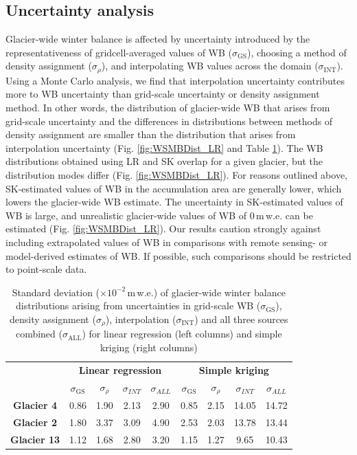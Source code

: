 \documentclass[review,oneside, letterpaper]{igs}
\begin{document}
\subsection{Uncertainty analysis}

Glacier-wide winter balance is affected by uncertainty introduced by the representativeness of gridcell-averaged values of WB ($\sigma_{\mathrm{GS}}$), choosing a method of density assignment ($\sigma_{\rho}$), and interpolating WB values across the domain ($\sigma_{\mathrm{INT}}$). Using a Monte Carlo analysis, we find that interpolation uncertainty contributes more to WB uncertainty than grid-scale uncertainty or density assignment method. In other words, the distribution of glacier-wide WB that arises from grid-scale uncertainty and the differences in distributions between methods of density assignment are smaller than the distribution that arises from interpolation uncertainty (Fig. \ref{fig:WSMBDist_LR} and Table \ref{tab:WSMBdistribution_sigma}). The WB distributions obtained using LR and SK overlap for a given glacier, but the distribution modes differ (Fig. \ref{fig:WSMBDist_LR}). For reasons outlined above, SK-estimated values of WB in the accumulation area are generally lower, which lowers the glacier-wide WB estimate.  The uncertainty in SK-estimated values of WB is large, and unrealistic glacier-wide values of WB of 0\,m\,w.e. can be estimated (Fig. \ref{fig:WSMBDist_LR}). Our results caution strongly against including extrapolated values of WB in comparisons with remote sensing- or model-derived estimates of WB. If possible, such comparisons should be restricted to point-scale data. 

 \begin{table}[]
\centering
\caption{Standard deviation ($\times10^{-2}$\,m\,w.e.) of glacier-wide winter balance distributions arising from uncertainties in grid-scale WB ($\sigma_{\mathrm{GS}}$), density assignment ($\sigma_{\rho}$), interpolation ($\sigma_{\mathrm{INT}}$) and all three sources combined ($\sigma_{\mathrm{ALL}}$) for linear regression (left columns) and simple kriging (right columns)}
\label{tab:WSMBdistribution_sigma}
\begin{tabular}{c|cccc|cccc}
 & \multicolumn{4}{c|}{\textbf{Linear regression}} & \multicolumn{4}{c}{\textbf{Simple kriging}} \\
\textbf{} & $\sigma_{\mathrm{GS}}$ & $\sigma_{\rho}$ & $\sigma_{INT}$ & $\sigma_{ALL}$ & $\sigma_{\mathrm{GS}}$ & $\sigma_{\rho}$ & $\sigma_{INT}$ & $\sigma_{ALL}$ \\ \hline
\textbf{Glacier 4} & 0.86 & 1.90 & 2.13 & 2.90 & 0.85 & 2.15 & 14.05 & 14.72 \\
\textbf{Glacier 2} & 1.80 & 3.37 & 3.09 & 4.90 & 2.53 & 2.03 & 13.78 & 13.44 \\
\textbf{Glacier 13} & 1.12 & 1.68 & 2.80 & 3.20 & 1.15 & 1.27 & 9.65 & 10.43
\end{tabular}
\end{table}
\end{document}
